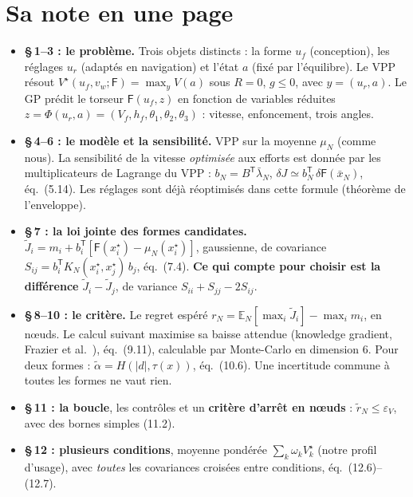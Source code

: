 \documentclass[11pt,a4paper]{article}
\newcommand{\F}{\mathsf{F}}
\newcommand{\tp}{^{\mathsf{T}}}
\begin{document}
\section{Sa note en une page}
\begin{itemize}
  \item \textbf{§\,1–3 : le problème.} Trois objets distincts : la forme $u_f$ (conception), les réglages
        $u_r$ (adaptés en navigation) et l'état $a$ (fixé par l'équilibre). Le VPP résout
        $V^\star(u_f,v_w;\F)=\max_y V(a)$ sous $R=0$, $g\le0$, avec $y=(u_r,a)$. Le GP prédit le torseur
        $\F(u_f,z)$ en fonction de variables réduites $z=\Phi(u_r,a)=(V_f,h_f,\theta_1,\theta_2,\theta_3)$ :
        vitesse, enfoncement, trois angles.
  \item \textbf{§\,4–6 : le modèle et la sensibilité.} VPP sur la moyenne $\mu_N$ (comme nous). La
        sensibilité de la vitesse \emph{optimisée} aux efforts est donnée par les multiplicateurs de
        Lagrange du VPP : $b_N=B\tp\bar\lambda_N$, $\delta J\simeq b_N\tp\,\delta\F(\bar x_N)$, éq.~(5.14).
        Les réglages sont déjà réoptimisés dans cette formule (théorème de l'enveloppe).
  \item \textbf{§\,7 : la loi jointe des formes candidates.} $\tilde J_i=m_i+b_i\tp[\F(x^\star_i)-\mu_N(x^\star_i)]$,
        gaussienne, de covariance $S_{ij}=b_i\tp K_N(x^\star_i,x^\star_j)\,b_j$, éq.~(7.4). \textbf{Ce qui
        compte pour choisir est la différence} $\tilde J_i-\tilde J_j$, de variance $S_{ii}+S_{jj}-2S_{ij}$.
  \item \textbf{§\,8–10 : le critère.} Le regret espéré $r_N=\mathbb E_N[\max_i \tilde J_i]-\max_i m_i$, en
        nœuds. Le calcul suivant maximise sa baisse attendue (knowledge gradient, Frazier et al.~\cite{FPD09}),
        éq.~(9.11), calculable par Monte-Carlo en dimension 6. Pour deux formes : $\tilde\alpha=H(|d|,\tau(x))$,
        éq.~(10.6). Une incertitude commune à toutes les formes ne vaut rien.
  \item \textbf{§\,11 : la boucle}, les contrôles et un \textbf{critère d'arrêt en nœuds} : $\tilde r_N\le
        \varepsilon_V$, avec des bornes simples (11.2).
  \item \textbf{§\,12 : plusieurs conditions}, moyenne pondérée $\sum_k\omega_k V^\star_k$ (notre profil
        d'usage), avec \emph{toutes} les covariances croisées entre conditions, éq.~(12.6)–(12.7).
\end{itemize}
\end{document}
